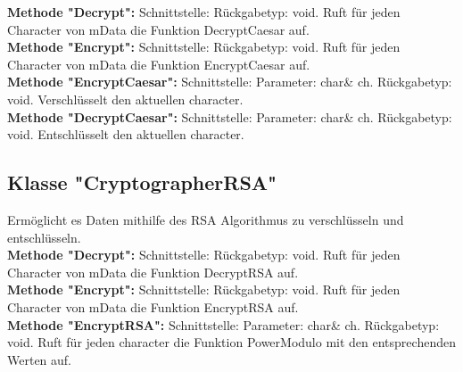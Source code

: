 \documentclass[12pt,a4paper]{article}
\begin{document}
\textbf {Methode "Decrypt": } 
\newline
Schnittstelle: 
Rückgabetyp: void.
\newline
Ruft für jeden Character von mData die Funktion DecryptCaesar auf.
\\

\textbf {Methode "Encrypt": } 
\newline
Schnittstelle:
\newline
Rückgabetyp: void.
\newline
Ruft für jeden Character von mData die Funktion EncryptCaesar auf.
\\

\textbf {Methode "EncryptCaesar": } 
\newline
Schnittstelle: 
\newline
Parameter: char\& ch.
\newline
Rückgabetyp: void.
\newline
Verschlüsselt den aktuellen character.
\\

\textbf {Methode "DecryptCaesar": } 
\newline
Schnittstelle: 
\newline
Parameter: char\& ch.
\newline
Rückgabetyp: void.
\newline
Entschlüsselt den aktuellen character.
\\


\subsection {Klasse "CryptographerRSA"}
Ermöglicht es Daten mithilfe des RSA Algorithmus zu verschlüsseln und entschlüsseln.
\\

\textbf {Methode "Decrypt": } 
\newline
Schnittstelle: 
Rückgabetyp: void.
\newline
Ruft für jeden Character von mData die Funktion DecryptRSA auf.
\\

\textbf {Methode "Encrypt": } 
\newline
Schnittstelle:
\newline
Rückgabetyp: void.
\newline
Ruft für jeden Character von mData die Funktion EncryptRSA auf.
\\

\textbf {Methode "EncryptRSA": } 
\newline
Schnittstelle: 
\newline
Parameter: char\& ch.
\newline
Rückgabetyp: void.
\newline
Ruft für jeden character die Funktion PowerModulo mit den entsprechenden Werten auf.
\\
\end{document}
